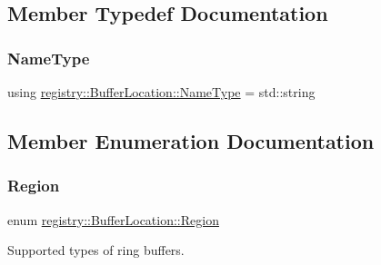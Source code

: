 \subsection{Member Typedef Documentation}
\mbox{\label{structregistry_1_1BufferLocation_ad3c2279012b74798fa1e348507020fa4}} 
\subsubsection{\texorpdfstring{Name\+Type}{NameType}}
{\footnotesize\ttfamily using \hyperlink{structregistry_1_1BufferLocation_ad3c2279012b74798fa1e348507020fa4}{registry\+::\+Buffer\+Location\+::\+Name\+Type} =  std\+::string}



\subsection{Member Enumeration Documentation}
\mbox{\label{structregistry_1_1BufferLocation_a07b156ecd0690dbebb5cba36d4d23ba0}} 
\subsubsection{\texorpdfstring{Region}{Region}}
{\footnotesize\ttfamily enum \hyperlink{structregistry_1_1BufferLocation_a07b156ecd0690dbebb5cba36d4d23ba0}{registry\+::\+Buffer\+Location\+::\+Region}}



Supported types of ring buffers. 

